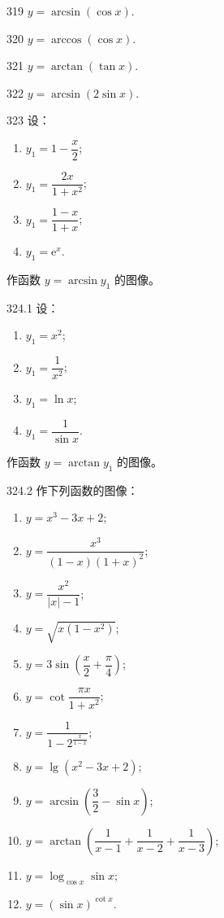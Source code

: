 \begin{prob}[S]{319}
$y = \arcsin(\cos x)$.
\end{prob}

\begin{prob}[S]{320}
$y = \arccos(\cos x)$.
\end{prob}

\begin{prob}[S]{321}
$y = \arctan(\tan x)$.
\end{prob}

\begin{prob}[S]{322}
$y = \arcsin(2\sin x)$.
\end{prob}

\begin{prob}[L]{323}
设：
\begin{enumerate}[label=(\alph*), itemsep=2pt, topsep=3pt]
  \item $y_1 = 1 - \dfrac{x}{2}$;
  \item $y_1 = \dfrac{2x}{1 + x^2}$;
  \item $y_1 = \dfrac{1 - x}{1 + x}$;
  \item $y_1 = \mathrm{e}^x$.
\end{enumerate}
作函数 $y = \arcsin y_1$ 的图像。
\end{prob}

\begin{prob}[L]{324.1}
设：
\begin{enumerate}[label=(\alph*), itemsep=2pt, topsep=3pt]
  \item $y_1 = x^2$;
  \item $y_1 = \dfrac{1}{x^2}$;
  \item $y_1 = \ln x$;
  \item $y_1 = \dfrac{1}{\sin x}$.
\end{enumerate}
作函数 $y = \arctan y_1$ 的图像。
\end{prob}

\begin{prob}[L]{324.2}
作下列函数的图像：
\begin{enumerate}[label=(\alph*), itemsep=2pt, topsep=3pt]
  \item $y = x^3 - 3x + 2$;
  \item $y = \dfrac{x^3}{(1 - x)(1 + x)^2}$;
  \item $y = \dfrac{x^2}{|x| - 1}$;
  \item $y = \sqrt{x(1 - x^2)}$;
  \item $y = 3\sin\left(\dfrac{x}{2} + \dfrac{\pi}{4}\right)$;
  \item $y = \cot\dfrac{\pi x}{1 + x^2}$;
  \item $y = \dfrac{1}{1 - 2^{\frac{x}{1 - x}}}$;
  \item $y = \lg(x^2 - 3x + 2)$;
  \item $y = \arcsin\left(\dfrac{3}{2} - \sin x\right)$;
  \item $y = \arctan\left(\dfrac{1}{x - 1} + \dfrac{1}{x - 2} + \dfrac{1}{x - 3}\right)$;
  \item $y = \log_{\cos x} \sin x$;
  \item $y = (\sin x)^{\cot x}$.
\end{enumerate}
\end{prob}

